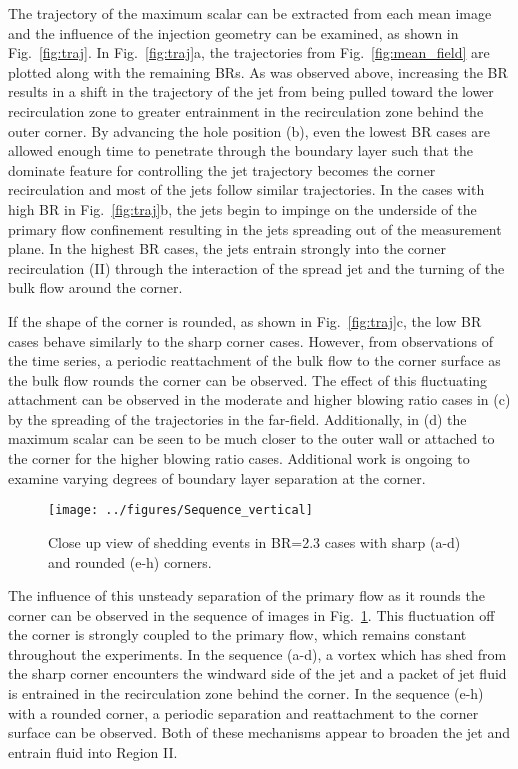 \documentclass[10pt, twocolumn]{article}
\begin{document}
The trajectory of the maximum scalar can be extracted from each mean image and the influence of the injection geometry can be examined, as shown in Fig.~\ref{fig:traj}. In Fig.~\ref{fig:traj}a, the trajectories from Fig.~\ref{fig:mean_field} are plotted along with the remaining BRs. As was observed above, increasing the BR results in a shift in the trajectory of the jet from being pulled toward the lower recirculation zone to greater entrainment in the recirculation zone behind the outer corner. By advancing the hole position (b), even the lowest BR cases are allowed enough time to penetrate through the boundary layer such that the dominate feature for controlling the jet trajectory becomes the corner recirculation and most of the jets follow similar trajectories. In the cases with high BR in Fig.~\ref{fig:traj}b, the jets begin to impinge on the underside of the primary flow confinement resulting in the jets spreading out of the measurement plane. In the highest BR cases, the jets entrain strongly into the corner recirculation (II) through the interaction of the spread jet and the turning of the bulk flow around the corner.

If the shape of the corner is rounded, as shown in Fig.~\ref{fig:traj}c, the low BR cases behave similarly to the sharp corner cases. However, from observations of the time series, a periodic reattachment of the bulk flow to the corner surface as the bulk flow rounds the corner can be observed. The effect of this fluctuating attachment can be observed in the moderate and higher blowing ratio cases in (c) by the spreading of the trajectories in the far-field. Additionally, in (d) the maximum scalar can be seen to be much closer to the outer wall or attached to the corner for the higher blowing ratio cases. Additional work is ongoing to examine varying degrees of boundary layer separation at the corner.

\begin{figure}[t!]
	\centering
	\texttt{[image: ../figures/Sequence\_vertical]}
	\caption{Close up view of shedding events in BR=2.3 cases with sharp (a-d) and rounded (e-h) corners.}
	\label{fig:seq}
\end{figure}

The influence of this unsteady separation of the primary flow as it rounds the corner can be observed in the sequence of images in Fig.~\ref{fig:seq}. This fluctuation off the corner is strongly coupled to the primary flow, which remains constant throughout the experiments. In the sequence (a-d), a vortex which has shed from the sharp corner encounters the windward side of the jet and a packet of jet fluid is entrained in the recirculation zone behind the corner. In the sequence (e-h) with a rounded corner, a periodic separation and reattachment to the corner surface can be observed. Both of these mechanisms appear to broaden the jet and entrain fluid into Region II.
\end{document}
